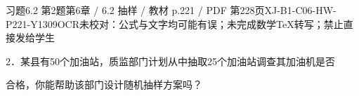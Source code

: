 \begin{bankitem}{习题6.2 第2题}{第6章 / 6.2 抽样 / 教材 p.221 / PDF 第228页}{XJ-B1-C06-HW-P221-Y1309}{OCR未校对：公式与文字均可能有误；未完成数学TeX转写；禁止直接发给学生}
\begin{ocrdraft}
\par
2．某县有50个加油站，质监部门计划从中抽取25个加油站调查其加油机是否
\par
合格，你能帮助该部门设计随机抽样方案吗？
\end{ocrdraft}
\end{bankitem}
